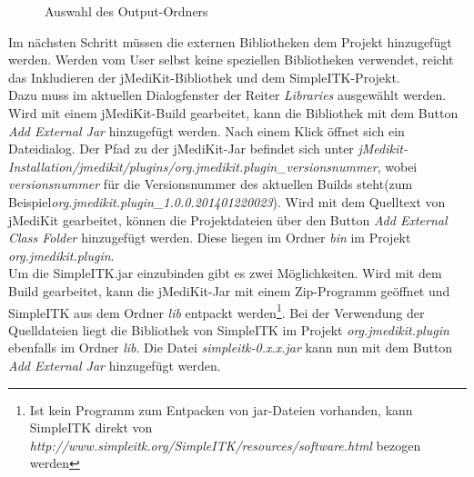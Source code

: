 \begin{figure}[H]
  \vspace{0.5cm}
  \centering
  \caption{Auswahl des Output-Ordners}
  \label{binfolder}
  \vspace{0.5cm}
\end{figure}

Im nächsten Schritt müssen die externen Bibliotheken dem Projekt hinzugefügt werden. Werden vom User selbst keine speziellen Bibliotheken verwendet, reicht das Inkludieren der jMediKit-Bibliothek und dem SimpleITK-Projekt.\\
Dazu muss im aktuellen Dialogfenster der Reiter \textit{Libraries} ausgewählt werden. Wird mit einem jMediKit-Build gearbeitet, kann die Bibliothek mit dem Button \textit{Add External Jar} hinzugefügt werden. Nach einem Klick öffnet sich ein Dateidialog. Der Pfad zu der jMediKit-Jar befindet sich unter \newline
\textit{jMedikit-Installation/}\textit{jmedikit/}\textit{plugins/}\textit{org.jmedikit.plugin\_versionsnummer}, wobei \textit{versionsnummer} für die Versionsnummer des aktuellen Builds steht(zum Beispiel\newline \textit{org.jmedikit.plugin\_1.0.0.201401220023}). Wird mit dem Quelltext von jMediKit gearbeitet, können die Projektdateien über den Button \textit{Add External Class Folder} hinzugefügt werden. Diese liegen im Ordner \textit{bin} im Projekt \textit{org.jmedikit.plugin}.\\
Um die SimpleITK.jar einzubinden gibt es zwei Möglichkeiten. Wird mit dem Build gearbeitet, kann die jMediKit-Jar mit einem Zip-Programm geöffnet und SimpleITK aus dem Ordner \textit{lib} entpackt werden\footnote{Ist kein Programm zum Entpacken von jar-Dateien vorhanden, kann SimpleITK direkt von \textit{http://www.simpleitk.org/SimpleITK/resources/software.html} bezogen werden}. Bei der Verwendung der Quelldateien liegt die Bibliothek von SimpleITK im Projekt \textit{org.jmedikit.plugin} ebenfalls im Ordner \textit{lib}. Die Datei \textit{simpleitk-0.x.x.jar} kann nun mit dem Button \textit{Add External Jar} hinzugefügt werden.

